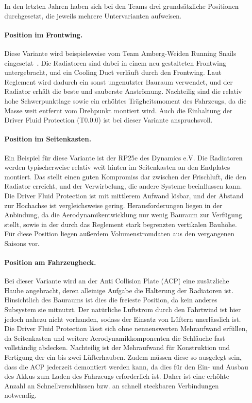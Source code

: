 In den letzten Jahren haben sich bei den Teams drei grundsätzliche Positionen
durchgesetzt, die jeweils mehrere Untervarianten aufweisen.

\paragraph{Position im Frontwing.}
Diese Variante wird beispielsweise vom Team Amberg-Weiden Running Snails
eingesetzt~\cite{TODO_Quelle_Running_Snails}. Die Radiatoren sind dabei in
einem neu gestalteten Frontwing untergebracht, und ein Cooling Duct verläuft
durch den Frontwing. Laut Reglement wird dadurch ein sonst ungenutzter
Bauraum verwendet, und der Radiator erhält die beste und sauberste
Anströmung. Nachteilig sind die relativ hohe Schwerpunktlage sowie ein
erhöhtes Trägheitsmoment des Fahrzeugs, da die Masse weit entfernt vom
Drehpunkt montiert wird. Auch die Einhaltung der Driver Fluid Protection
(T0.0.0) ist bei dieser Variante anspruchsvoll.

\paragraph{Position im Seitenkasten.}
Ein Beispiel für diese Variante ist der RP25e des Dynamics e.V. Die
Radiatoren werden typischerweise relativ weit hinten im Seitenkasten an den
Endplates montiert. Das stellt einen guten Kompromiss dar zwischen der
Frischluft, die den Radiator erreicht, und der Verwirbelung, die andere
Systeme beeinflussen kann. Die Driver Fluid Protection ist mit mittlerem
Aufwand lösbar, und der Abstand zur Hochachse ist vergleichsweise gering.
Herausforderungen liegen in der Anbindung, da die Aerodynamikentwicklung nur
wenig Bauraum zur Verfügung stellt, sowie in der durch das Reglement stark
begrenzten vertikalen Bauhöhe. Für diese Position liegen außerdem
Volumenstromdaten aus den vergangenen Saisons vor.

\paragraph{Position am Fahrzeugheck.}
Bei dieser Variante wird an der Anti Collision Plate (ACP) eine zusätzliche
Haube angebracht, deren alleinige Aufgabe die Halterung der Radiatoren ist.
Hinsichtlich des Bauraums ist dies die freieste Position, da kein anderes
Subsystem sie mitnutzt. Der natürliche Luftstrom durch den Fahrtwind ist
hier jedoch nahezu nicht vorhanden, sodass der Einsatz von Lüftern
unerlässlich ist. Die Driver Fluid Protection lässt sich ohne nennenswerten
Mehraufwand erfüllen, da Seitenkasten und weitere Aerodynamikkomponenten die
Schläuche fast vollständig abdecken. Nachteilig ist der Mehraufwand für
Konstruktion und Fertigung der ein bis zwei Lüfterhauben. Zudem müssen diese
so ausgelegt sein, dass die ACP jederzeit demontiert werden kann, da dies
für den Ein- und Ausbau des Akkus zum Laden des Fahrzeugs erforderlich ist.
Daher ist eine erhöhte Anzahl an Schnellverschlüssen bzw. an schnell
steckbaren Verbindungen notwendig.

